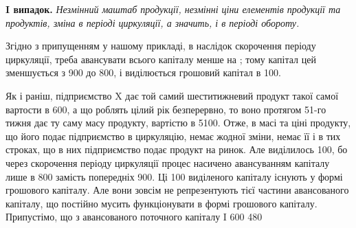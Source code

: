 \textbf{I випадок.} \emph{Незмінний маштаб продукції, незмінні ціни елементів
продукції та продуктів, зміна в періоді циркуляції, а значить, і в періоді
обороту.}

Згідно з припущенням у нашому прикладі, в наслідок скорочення періоду
циркуляції, треба авансувати всього капіталу менше на ; тому
капітал цей зменшується з 900 до 800, і виділюється грошовий
капітал в 100.

Як і раніш, підприємство X дає той самий шеститижневий продукт такої
самої вартости в 600, а що роблять цілий рік безперервно, то
воно протягом 51-го тижня дає ту саму масу продукту, вартістю в 5100. Отже, в масі та ціні продукту, що його подає підприємство в
циркуляцію, немає жодної зміни, немає її і в тих строках, що в них підприємство
подає продукт на ринок. Але виділилось 100, бо
через скорочення періоду циркуляції процес насичено авансуванням капіталу
лише в 800 замість попередніх 900. Ці 100 виділеного капіталу існують у формі грошового капіталу. Але вони
зовсім не репрезентують тієї частини авансованого капіталу, що постійно
мусить функціонувати в формі грошового капіталу. Припустімо, що з
авансованого поточного капіталу I \deq{} 600  \deq{} 480
\parbreak{}  %
